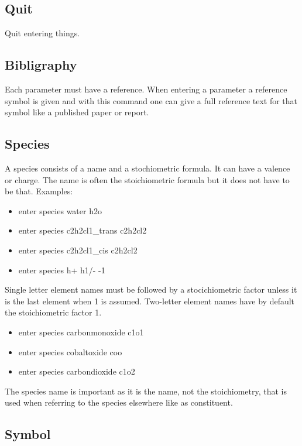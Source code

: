 \documentclass[12pt]{article}
\begin{document}
\subsection{Quit}

Quit entering things.

\subsection{Bibligraphy}

Each parameter must have a reference.  When entering a parameter a
reference symbol is given and with this command one can give a full
reference text for that symbol like a published paper or report.

\subsection{Species}

A species consists of a name and a stochiometric formula.  It can have
a valence or charge.  The name is often the stoichiometric formula
but it does not have to be that.  Examples:

\begin{itemize}
\item enter species water h2o
\item enter species c2h2cl1\_trans c2h2cl2
\item enter species c2h2cl1\_cis c2h2cl2
\item enter species h+ h1/- -1
\end{itemize}

Single letter element names must be followed by a stocichiometric
factor unless it is the last element when 1 is assumed.  Two-letter
element names have by default the stoichiometric factor 1.

\begin{itemize}
\item enter species carbonmonoxide c1o1
\item enter species cobaltoxide coo
\item enter species carbondioxide c1o2
\end{itemize}

The species name is important as it is the name, not the
stoichiometry, that is used when referring to the species elsewhere
like as constituent.

\subsection{Symbol}
\end{document}
